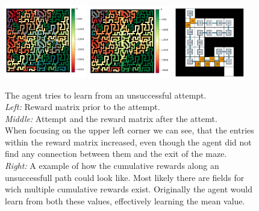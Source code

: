 \documentclass[12pt,a4paper]{scrartcl}
\begin{document}
\begin{figure}[htbp]
    \centering
    \includegraphics[width = 0.32\textwidth]{algorithms/false_high_1.png}
    \includegraphics[width = 0.32\textwidth]{algorithms/false_high_2.png}
    \includegraphics[width = 0.28\textwidth]{algorithms/new_rewards.png}
    \caption{
        The agent tries to learn from an unsuccessful attempt.\\
        \textit{Left:} Reward matrix prior to the attempt.\\
        \textit{Middle:} Attempt and the reward matrix after the attemt.\\
        When focusing on the upper left corner we can see, that the entries
        within the reward matrix increased, even though the agent did not find
        any connection between them and the exit of the maze. \\
        \textit{Right:} A example of how the cumulative rewards along an
        unsuccessfull path could look like. Most likely there are fields for
        wich multiple cumulative rewards exist. Originally the agent would learn
        from both these values, effectively learning the mean value.
    }
    \label{fig:false_high}
\end{figure}
\end{document}
